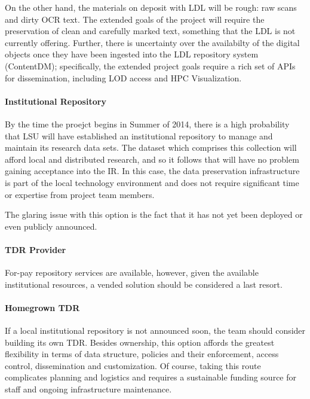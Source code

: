 On the other hand, the materials on deposit with LDL will be rough: raw scans and dirty OCR text. The extended goals of the project will require the preservation of clean and carefully marked text, something that the LDL is not currently offering. Further, there is uncertainty over the availabilty of the digital objects once they have been ingested into the LDL repository system (ContentDM); specifically, the extended project goals require a rich set of APIs for dissemination, including LOD access and HPC Visualization.

\paragraph{Institutional Repository}
By the time the proejct begins in Summer of 2014, there is a high probability that LSU will have established an institutional repository to manage and maintain its research data sets. The dataset which comprises this collection will afford local and distributed research, and so it follows that \projectname{} will have no problem gaining acceptance into the IR. In this case, the data preservation infrastructure is part of the local technology environment and does not require significant time or expertise from project team members.

The glaring issue with this option is the fact that it has not yet been deployed or even publicly announced.

\paragraph{TDR Provider}
For-pay repository services are available, however, given the available institutional resources, a vended solution should be considered a last resort.

\paragraph{Homegrown TDR}
If a local institutional repository is not announced soon, the team should consider building its own TDR. Besides ownership, this option affords the greatest flexibility in terms of data structure, policies and their enforcement, access control, dissemination and customization. Of course, taking this route complicates planning and logistics and requires a sustainable funding source for staff and ongoing infrastructure maintenance.


